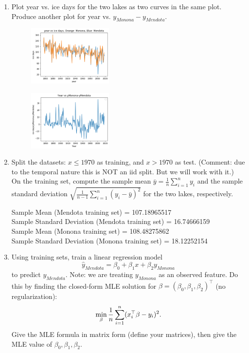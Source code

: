 \documentclass[a4paper]{article}
\theoremstyle{definition}
\newenvironment{soln}{
    \leavevmode\color{blue}\ignorespaces
}{}
\begin{document}
\begin{enumerate}
\item
Plot year vs. ice days for the two lakes as two curves in the same plot.
Produce another plot for year vs. $y_{Monona} - y_{Mendota}$.

\begin{soln}
\begin{figure}[H]
	        \centering
	        \includegraphics[width=0.4\textwidth]{1.png}
	    \end{figure}

\begin{figure}[H]
	        \centering
	        \includegraphics[width=0.4\textwidth]{2.png}
	    \end{figure}
\end{soln}


\item
Split the datasets: $x\le 1970$ as training, and $x>1970$ as test.
(Comment: due to the temporal nature this is NOT an iid split.  But we will work with it.)
On the training set, compute the sample mean $\bar y=\frac{1}{n}\sum_{i=1}^n y_i$ and the sample standard deviation $\sqrt{\frac{1}{n-1}\sum_{i=1}^n (y_i-\bar y)^2}$ for the two lakes, respectively.

\begin{soln}
Sample Mean (Mendota training set) = 107.18965517\\
Sample Standard Deviation (Mendota training set) = 16.74666159\\
Sample Mean (Monona training set) = 108.48275862\\
Sample Standard Deviation (Monona training set) = 18.12252154
\end{soln}

\item
Using training sets, train a linear regression model
$$\hat y_{Mendota} = \beta_0 + \beta_1 x + \beta_2 y_{Monona}$$
to predict $y_{Mendota}$.
Note: we are treating $y_{Monona}$ as an observed feature.
Do this by finding the closed-form MLE solution for $\beta=(\beta_0, \beta_1, \beta_2)^\top$ (no regularization):
$$\min_\beta {1\over n} \sum_{i=1}^n (x_i^\top \beta - y_i)^2.$$
Give the MLE formula in matrix form (define your matrices), then give the MLE value of $\beta_0, \beta_1, \beta_2$. 



\end{enumerate}
\end{document}
